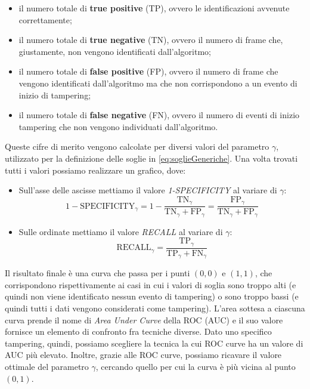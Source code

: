 \begin{itemize}
	\item il numero totale di \textbf{true positive} (TP), ovvero le identificazioni avvenute correttamente;
	\item il numero totale di \textbf{true negative} (TN), ovvero il numero di frame che, giustamente, non vengono identificati dall'algoritmo;
	\item il numero totale di \textbf{false positive} (FP), ovvero il numero di frame che vengono identificati dall'algoritmo ma che non corrispondono a un evento di inizio di tampering;
	\item il numero totale di \textbf{false negative} (FN), ovvero il numero di eventi di inizio tampering che non vengono individuati dall'algoritmo.
\end{itemize}
Queste cifre di merito vengono calcolate per diversi valori del parametro $\gamma$, utilizzato per la definizione delle soglie in \eqref{eq:soglieGeneriche}.
Una volta trovati tutti i valori possiamo realizzare un grafico, dove:
\begin{itemize}
	\item Sull'asse delle ascisse mettiamo il valore \textit{1-SPECIFICITY} al variare di $\gamma$:
	\[1-\text{SPECIFICITY}_\gamma = 1-\frac{\text{TN}_\gamma}{\text{TN}_\gamma+\text{FP}_\gamma}=\frac{\text{FP}_\gamma}{\text{TN}_\gamma+\text{FP}_\gamma}\]
	\item Sulle ordinate mettiamo il valore \textit{RECALL} al variare di $\gamma$:
	\[\text{RECALL}_\gamma=\frac{\text{TP}_\gamma}{\text{TP}_\gamma+\text{FN}_\gamma} \]
\end{itemize}
Il risultato finale \`e una curva che passa per i punti $(0,0)$ e $(1,1)$, che corrispondono rispettivamente ai casi in cui i valori di soglia sono troppo alti (e quindi non viene identificato nessun evento di tampering) o sono troppo bassi (e quindi tutti i dati vengono considerati come tampering).
L'area sottesa a ciascuna curva prende il nome di \textit{Area Under Curve} della ROC (AUC) e il suo valore fornisce un elemento di confronto fra tecniche diverse.  
Dato uno specifico tampering, quindi, possiamo scegliere la tecnica la cui ROC curve ha un valore di AUC pi\`u elevato.
Inoltre, grazie alle ROC curve, possiamo ricavare il valore ottimale del parametro $\gamma$, cercando quello per cui la curva \`e pi\`u vicina al punto $(0,1)$.

